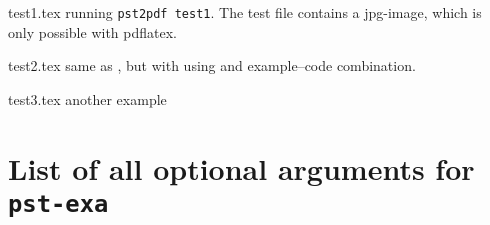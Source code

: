 \documentclass[11pt,english,BCOR10mm,DIV12,bibliography=totoc,parskip=false,
   smallheadings, headexclude,footexclude,oneside]{pst-doc}
\begin{document}
\begin{compactdesc}
\item[test1.tex] running \verb=pst2pdf test1=. The test file contains a jpg-image, which is only possible with pdflatex.
\item[test2.tex] same as , but with using  and example--code combination.
\item[test3.tex] another example 
\end{compactdesc}

\section{List of all optional arguments for \texttt{pst-exa}}





\bgroup
\raggedright
\nocite{*}


\egroup

\printindex
\end{document}
